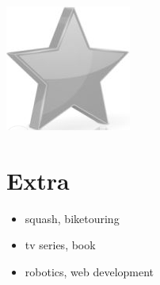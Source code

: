 \documentclass[10pt,a4paper,sans]{article}
\begin{document}
\begin{minipage}[t]{0.28\textwidth}
\begin{mdframed}[style=cadreCompetences]
\begin{itemize}
{                    \includegraphics[scale=0.25]{img/empty_star.png}}
            \end{itemize}

        \section{Extra}
            \begin{itemize}
                \item{squash, biketouring}
                \item{tv series, book}
                \item{robotics, web development}
            \end{itemize}
    \end{mdframed}
\end{minipage}
\hfill
\end{document}
